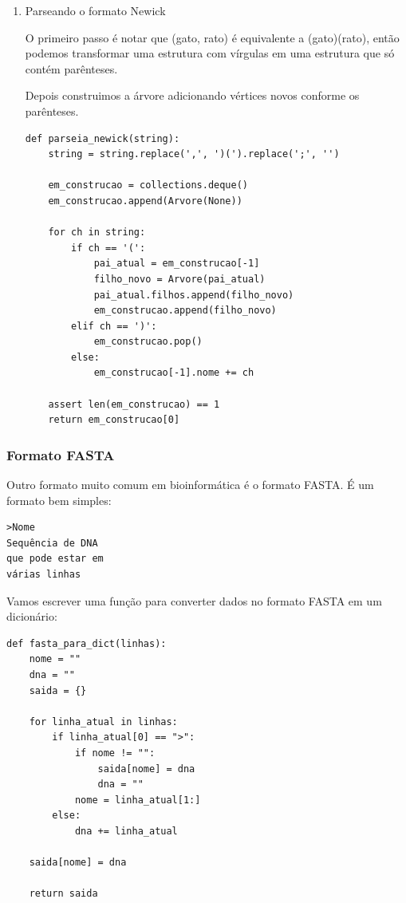 \documentclass[11pt]{article}
\begin{document}
\begin{enumerate}
\item Parseando o formato Newick
\label{sec-4-3-1-1}

O primeiro passo é notar que (gato, rato) é equivalente a
(gato)(rato), então podemos transformar uma estrutura com vírgulas
em uma estrutura que só contém parênteses.

Depois construimos a árvore adicionando vértices novos conforme os
parênteses.
\begin{verbatim}
def parseia_newick(string):
    string = string.replace(',', ')(').replace(';', '')

    em_construcao = collections.deque()
    em_construcao.append(Arvore(None))

    for ch in string:
        if ch == '(':
            pai_atual = em_construcao[-1]
            filho_novo = Arvore(pai_atual)
            pai_atual.filhos.append(filho_novo)
            em_construcao.append(filho_novo)
        elif ch == ')':
            em_construcao.pop()
        else:
            em_construcao[-1].nome += ch

    assert len(em_construcao) == 1
    return em_construcao[0]
\end{verbatim}
\end{enumerate}

\subsubsection{Formato FASTA}
\label{sec-4-3-2}

Outro formato muito comum em bioinformática é o formato FASTA. É um
formato bem simples:

\begin{verbatim}
>Nome
Sequência de DNA
que pode estar em
várias linhas
\end{verbatim}

Vamos escrever uma função para converter dados no formato FASTA em um
dicionário:
\begin{verbatim}
def fasta_para_dict(linhas):
    nome = ""
    dna = ""
    saida = {}

    for linha_atual in linhas:
        if linha_atual[0] == ">":
            if nome != "":
                saida[nome] = dna
                dna = ""
            nome = linha_atual[1:]
        else:
            dna += linha_atual

    saida[nome] = dna

    return saida
\end{verbatim}
\end{document}
